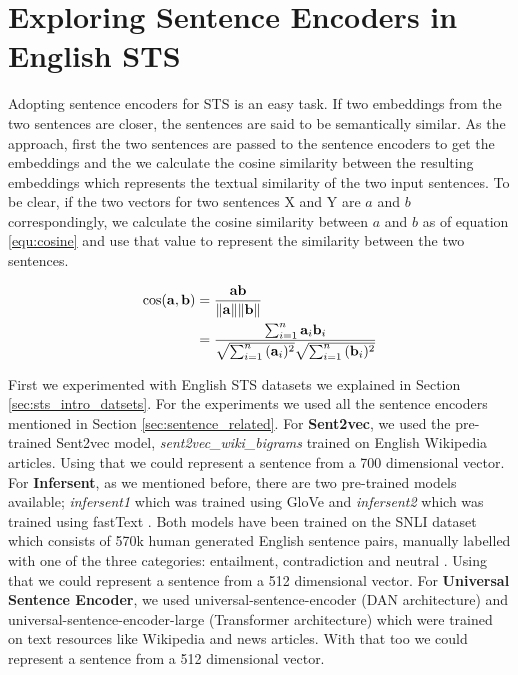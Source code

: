 \section{Exploring Sentence Encoders in English STS}
\label{sec:sentence_method}
Adopting sentence encoders for STS is an easy task.  If two embeddings from the two sentences are closer, the sentences are said to be semantically similar. As the approach, first the two sentences are passed to the sentence encoders to get the embeddings and the we calculate the cosine similarity between the resulting embeddings which represents the textual similarity of the two input sentences. To be clear, if the two vectors for two sentences X and Y are $a$ and $b$ correspondingly, we calculate the cosine similarity between $a$ and $b$ as of equation \ref{equ:cosine} and use that value to represent the similarity between the two sentences. 

\begin{equation}
	\label{equ:cosine}
	\begin{aligned}
		\cos ({\bf a},{\bf b})= {} & {{\bf a} {\bf b} \over \|{\bf a}\| \|{\bf b}\|} \\
		= {} & \frac{ \sum_{i=1}^{n}{{\bf a}_i{\bf b}_i} }{ \sqrt{\sum_{i=1}^{n}{({\bf a}_i)^2}} \sqrt{\sum_{i=1}^{n}{({\bf b}_i)^2}} }
	\end{aligned}
\end{equation}

First we experimented with English STS datasets we explained in Section \ref{sec:sts_intro_datsets}. For the experiments we used all the sentence encoders mentioned in Section \ref{sec:sentence_related}. For \textbf{Sent2vec}, we used the pre-trained Sent2vec model, \textit{sent2vec\_wiki\_bigrams} trained on English Wikipedia articles. Using that we could represent a sentence from a 700 dimensional vector. For \textbf{Infersent}, as we mentioned before, there are two pre-trained models available; \textit{infersent1} which was trained using GloVe \cite{pennington-etal-2014-glove} and \textit{infersent2} which was trained using fastText \cite{mikolov-etal-2018-advances}. Both models have been trained on the SNLI dataset which consists of 570k human generated English sentence pairs, manually labelled with one of the three categories: entailment, contradiction and neutral \cite{bowman-etal-2015-large}. Using that we could represent a sentence from a 512 dimensional vector. For \textbf{Universal Sentence Encoder}, we used universal-sentence-encoder (DAN architecture) and universal-sentence-encoder-large (Transformer architecture) which were trained on text resources like Wikipedia and news articles. With that too we could represent a sentence from a 512 dimensional vector.

